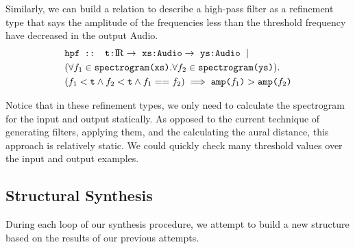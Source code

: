 Similarly, we can build a relation to describe a high-pass filter as a refinement type that says the amplitude of the frequencies less than the threshold frequency have decreased in the output Audio.
%
\begin{align*}
  &\texttt{hpf :: t:\reals} \to\ \texttt{xs:Audio} \to\ \texttt{ys:Audio}\ \mid \\
  &(\forall f_1 \in \texttt{spectrogram(xs)}. \forall f_2 \in \texttt{spectrogram(ys)}). \\
  &(f_1 < \texttt{t} \land f_2 < \texttt{t} \land f_1 == f_2) \implies \texttt{amp(}f_1\texttt{)} > \texttt{amp(} f_2 \texttt{)} 
\end{align*}

Notice that in these refinement types, we only need to calculate the spectrogram for the input and output statically.
As opposed to the current technique of generating filters, applying them, and the calculating the aural distance, this approach is relatively static.
We could quickly check many threshold values over the input and output examples.

\subsection{Structural Synthesis}

During each loop of our synthesis procedure, we attempt to build a new structure based on the results of our previous attempts.
